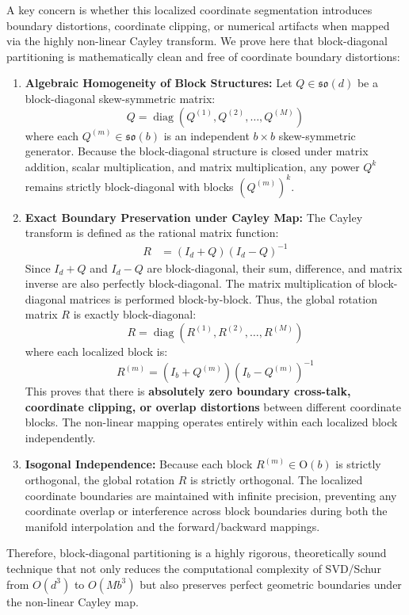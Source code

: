A key concern is whether this localized coordinate segmentation introduces boundary distortions, coordinate clipping, or numerical artifacts when mapped via the highly non-linear Cayley transform. We prove here that block-diagonal partitioning is mathematically clean and free of coordinate boundary distortions:
\begin{enumerate}
    \item \textbf{Algebraic Homogeneity of Block Structures:} Let $Q \in \mathfrak{so}(d)$ be a block-diagonal skew-symmetric matrix:
    \begin{equation}
    Q = \operatorname{diag}\left( Q^{(1)}, Q^{(2)}, \dots, Q^{(M)} \right)
    \end{equation}
    where each $Q^{(m)} \in \mathfrak{so}(b)$ is an independent $b \times b$ skew-symmetric generator. 
    Because the block-diagonal structure is closed under matrix addition, scalar multiplication, and matrix multiplication, any power $Q^k$ remains strictly block-diagonal with blocks $\left(Q^{(m)}\right)^k$.
    \item \textbf{Exact Boundary Preservation under Cayley Map:} The Cayley transform is defined as the rational matrix function:
    \begin{align}
    R &= (I_d + Q)(I_d - Q)^{-1}
    \end{align}
    Since $I_d + Q$ and $I_d - Q$ are block-diagonal, their sum, difference, and matrix inverse are also perfectly block-diagonal. The matrix multiplication of block-diagonal matrices is performed block-by-block. Thus, the global rotation matrix $R$ is exactly block-diagonal:
    \begin{equation}
    R = \operatorname{diag}\left( R^{(1)}, R^{(2)}, \dots, R^{(M)} \right)
    \end{equation}
    where each localized block is:
    \begin{equation}
    R^{(m)} = \left( I_b + Q^{(m)} \right) \left( I_b - Q^{(m)} \right)^{-1}
    \end{equation}
    This proves that there is \textbf{absolutely zero boundary cross-talk, coordinate clipping, or overlap distortions} between different coordinate blocks. The non-linear mapping operates entirely within each localized block independently.
    \item \textbf{Isogonal Independence:} Because each block $R^{(m)} \in \mathrm{O}(b)$ is strictly orthogonal, the global rotation $R$ is strictly orthogonal. The localized coordinate boundaries are maintained with infinite precision, preventing any coordinate overlap or interference across block boundaries during both the manifold interpolation and the forward/backward mappings.
\end{enumerate}
Therefore, block-diagonal partitioning is a highly rigorous, theoretically sound technique that not only reduces the computational complexity of SVD/Schur from $O(d^3)$ to $O(M b^3)$ but also preserves perfect geometric boundaries under the non-linear Cayley map.

